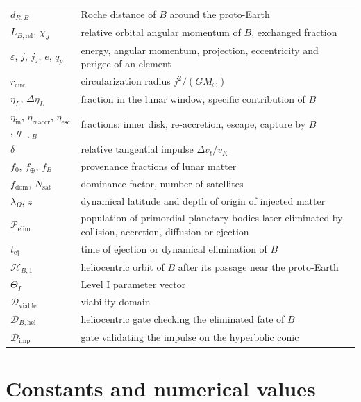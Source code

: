 \documentclass[11pt,a4paper,openany]{report}
\newcommand{\Mt}{M_{\oplus}}
\begin{document}
\begin{longtable}{>{\raggedright\arraybackslash}p{3.2cm}>{\raggedright\arraybackslash}p{11.6cm}}
$d_{R,B}$ & Roche distance of $B$ around the proto-Earth \\
$L_{B,\mathrm{rel}}$, $\chi_J$ & relative orbital angular momentum of $B$, exchanged fraction \\
$\varepsilon$, $j$, $j_z$, $e$, $q_p$ & energy, angular momentum, projection, eccentricity and perigee of an element \\
$r_{\mathrm{circ}}$ & circularization radius $j^2/(G\Mt)$ \\
$\eta_L$, $\Delta\eta_L$ & fraction in the lunar window, specific contribution of $B$ \\
$\eta_{\mathrm{in}}$, $\eta_{\mathrm{reaccr}}$, $\eta_{\mathrm{esc}}$, $\eta_{\to B}$ & fractions: inner disk, re-accretion, escape, capture by $B$ \\
$\delta$ & relative tangential impulse $\Delta v_t/v_K$ \\
$f_0$, $f_\oplus$, $f_B$ & provenance fractions of lunar matter \\
$f_{\mathrm{dom}}$, $N_{\mathrm{sat}}$ & dominance factor, number of satellites \\
$\lambda_\Omega$, $z$ & dynamical latitude and depth of origin of injected matter \\
$\mathcal{P}_{\mathrm{elim}}$ & population of primordial planetary bodies later eliminated by collision, accretion, diffusion or ejection \\
$t_{\mathrm{ej}}$ & time of ejection or dynamical elimination of $B$ \\
$\mathcal{H}_{B,1}$ & heliocentric orbit of $B$ after its passage near the proto-Earth \\
$\Theta_I$ & Level I parameter vector \\
$\mathcal{D}_{\mathrm{viable}}$ & viability domain \\
$\mathcal{D}_{B,\mathrm{hel}}$ & heliocentric gate checking the eliminated fate of $B$ \\
$\mathcal{D}_{\mathrm{imp}}$ & gate validating the impulse on the hyperbolic conic \\
\bottomrule
\end{longtable}
\normalsize

\chapter{Constants and numerical values}
\label{app:constantes}
\end{document}
